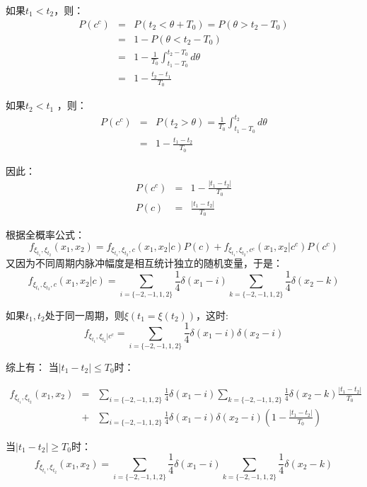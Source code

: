 \documentclass[10pt,a4paper,UTF8]{article}
\begin{document}
\begin{answer}
如果\(t_{1} < t_{2}\)，则：
\begin{eqnarray}
\label{eq:1}
P(c^{c})&=& P(t_{2} < \theta + T_{0}) = P( \theta > t_{2} - T_{0}) \\
&=& 1- P(\theta < t_{2} - T_{0}) \\
&=& 1- \frac{1}{T_{0}}\int_{t_{1} - T_{0}}^{t_{2} - T_{0}} d\theta \\
&=& 1- \frac{t_{2} - t_{1}}{T_{0}}
\end{eqnarray}

如果\(t_{2} < t_{1}\) ，则：
\begin{eqnarray}
\label{eq:2}
P(c^{c})&=& P(t_{2} > \theta) = \frac{1}{T_{0}} \int_{t_{1} - T_{0}}^{t_{2}}d\theta \\
&=& 1- \frac{t_{1}-t_{2}}{T_{0}} 
\end{eqnarray}

因此：
\begin{eqnarray}
\label{eq:3}
P(c^{c})&=&  1- \frac{|t_{1}-t_{2}|}{T_{0}} \\
P(c) &=&\frac{|t_{1}-t_{2}|}{T_{0}}
\end{eqnarray}

根据全概率公式：
\begin{equation}
\label{eq:4}
f_{\xi_{t_{1}},\xi_{t_{2}}}(x_{1},x_{2}) = f_{\xi_{t_{1}},\xi_{t_{2}},c}(x_{1},x_{2}|c)P(c) + f_{\xi_{t_{1}},\xi_{t_{2}},c^{c}}(x_{1},x_{2}|c^{c})P(c^{c}) 
\end{equation}
又因为不同周期内脉冲幅度是相互统计独立的随机变量，于是：
\begin{equation}
\label{eq:5}
f_{\xi_{t_{1}},\xi_{t_{2}},c}(x_{1},x_{2}|c) = \sum_{i=\{-2,-1,1,2\}}\frac{1}{4}\delta(x_{1} - i)  \sum_{k=\{-2,-1,1,2\}}\frac{1}{4}\delta(x_{2} - k) 
\end{equation}

如果\(t_{1},t_{2}\)处于同一周期，则\(\xi(t_{1} = \xi(t_{2}))\)，这时:
\begin{equation}
\label{eq:6}
f_{\xi_{t_{1}},\xi_{t_{2}} |c^{c}} = \sum_{i=\{-2,-1,1,2\}} \frac{1}{4}\delta(x_{1} - i)\delta(x_{2} - i)
\end{equation}

综上有：
当\(|t_{1} - t_{2}| \leq T_{0}\)时：

\begin{eqnarray}
\label{eq:9}
f_{\xi_{t_{1}},\xi_{t_{2}}}(x_{1},x_{2}) &=& \sum_{i=\{-2,-1,1,2\}}\frac{1}{4}\delta(x_{1} - i)  \sum_{k=\{-2,-1,1,2\}}\frac{1}{4}\delta(x_{2} - k) \frac{|t_{1} - t_{2}|}{T_{0}}\\ 
&+& \sum_{i=\{-2,-1,1,2\}} \frac{1}{4}\delta(x_{1} - i)\delta(x_{2} - i)(1- \frac{|t_{1} - t_{2}|}{T_{0}})
\end{eqnarray}

当\(|t_{1} - t_{2}| \geq T_{0}\)时：
\begin{equation}
\label{eq:8}
f_{\xi_{t_{1}},\xi_{t_{2}}}(x_{1},x_{2}) = \sum_{i=\{-2,-1,1,2\}}\frac{1}{4}\delta(x_{1} - i)  \sum_{k=\{-2,-1,1,2\}}\frac{1}{4}\delta(x_{2} - k)
\end{equation}
\end{answer}
\end{document}
